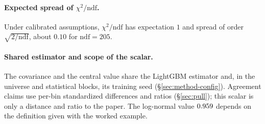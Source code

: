 \paragraph{Expected spread of $\chi^{2}/\mathrm{ndf}$.} Under calibrated assumptions, $\chi^{2}/\mathrm{ndf}$ has expectation $1$ and spread of order $\sqrt{2/\mathrm{ndf}}$, about $0.10$ for $\mathrm{ndf}=205$.

\paragraph{Shared estimator and scope of the scalar.} The covariance and the central value share the LightGBM estimator and, in the universe and statistical blocks, its training seed (\S\ref{sec:method-config}). Agreement claims use per-bin standardized differences and ratios (\S\ref{sec:pull}); this scalar is only a distance and ratio to the paper. The log-normal value $0.959$ depends on the definition given with the worked example.

